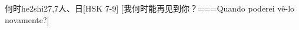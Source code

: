 \begin{EntryWithPhonetic}{何时}{he2shi2}{7,7}{⼈、⽇}[HSK 7-9]
  [我何时能再见到你？===Quando poderei vê-lo novamente?]
\end{EntryWithPhonetic}
